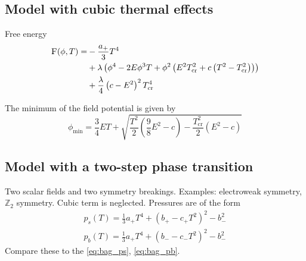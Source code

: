 \iffalse
Now we have everything necessary to compute $\alpha_+$ and the Chapman-Jouguet speed $v_{CJ}$ analytically from $c_{s+}$, $c_{s-}$ and $\alpha_n$.
From these we get $w_n$ with \eqref{eq:wn_const_cs}, and for a detonation $w_+=w_n$.
This we can insert to \eqref{eq:wm_const_cs}, giving us $w_-$.
Now we have all the variables necessary to compute $\alpha_+$ with \eqref{eq:alpha_plus}.
Then we insert $\tilde{v}_- = c_{s-}$ to \eqref{eq:v_tilde_plus}, giving us the Chapman-Jouguet speed $v_{CJ} = v_+$.
\todo{This is wrong! We have a circular dependency and must solve the equation group at once.}
\fi


\subsection{Model with cubic thermal effects}
Free energy
\cite[eq. 45]{giese_2020}
\begin{align}
\begin{split}
\textsc{F}(\phi, T) =
&- \frac{a_+}{3} T^4 \\
&+ \lambda \left( \phi^4 - 2E\phi^3 T + \phi^2 \left( E^2 T_\text{cr}^2 + c \left( T^2 - T_\text{cr}^2 \right) \right) \right) \\
&+ \frac{\lambda}{4} \left( c - E^2 \right)^2 T_\text{cr}^4
\end{split}
\end{align}

The minimum of the field potential is given by
\cite[eq. 46]{giese_2020}
\begin{equation}
\phi_\text{min} = \frac{3}{4} ET + \sqrt{\frac{T^2}{2}(\frac{9}{8}E^2 - c) - \frac{T_\text{cr}^2}{2} (E^2 - c)}
\end{equation}


\subsection{Model with a two-step phase transition}
Two scalar fields and two symmetry breakings. Examples: electroweak symmetry, $\mathbb{Z}_2$ symmetry.
Cubic term is neglected.
Pressures are of the form
\cite[eq. 47-48]{giese_2020}
\begin{align}
p_s(T) = \frac{1}{3}a_+ T^4 + (b_+ - c_+ T^2)^2 - b_-^2 \\
p_b(T) = \frac{1}{3}a_+ T^4 + (b_- - c_-T^2)^2 - b_-^2
\end{align}
Compare these to the \eqref{eq:bag_ps}, \eqref{eq:bag_pb}.


